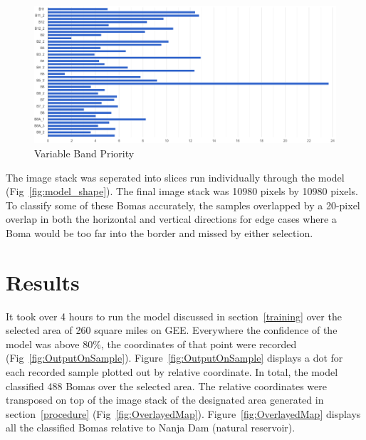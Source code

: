 \documentclass[10pt]{article}
\begin{document}
\begin{figure} [H]
    \centering
    \includegraphics[width=1\linewidth]{images/bands importance.png}
    \caption{Variable Band Priority}
    \label{fig:band_importance}
\end{figure}

The image stack was seperated into slices run individually through the model (Fig~\ref{fig:model_shape}). The final image stack was 10980 pixels by 10980 pixels. To classify some of these Bomas accurately, the samples overlapped by a 20-pixel overlap in both the horizontal and vertical directions for edge cases where a Boma would be too far into the border and missed by either selection.


\section{Results}

It took over 4 hours to run the model discussed in section~\ref{training} over the selected area of 260 square miles on GEE. Everywhere the confidence of the model was above 80\%, the coordinates of that point were recorded (Fig~\ref{fig:OutputOnSample}). Figure~\ref{fig:OutputOnSample} displays a dot for each recorded sample plotted out by relative coordinate. In total, the model classified 488 Bomas over the selected area. The relative coordinates were transposed on top of the image stack of the designated area generated in section~\ref{procedure} (Fig~\ref{fig:OverlayedMap}). Figure~\ref{fig:OverlayedMap} displays all the classified Bomas relative to Nanja Dam (natural reservoir).
\end{document}
